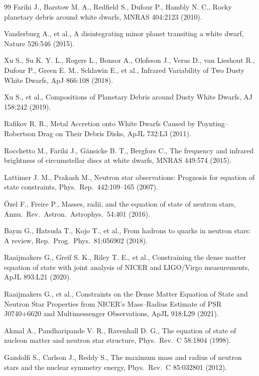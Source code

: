 \begin{thebibliography}{99}
Farihi J., Barstow M. A., Redfield S., Dufour P., Hambly N. C., Rocky planetary debris around white dwarfs, MNRAS 404:2123 (2010).

Vanderburg A., et al., A disintegrating minor planet transiting a white dwarf, Nature 526:546 (2015).

Xu S., Su K. Y. L., Rogers L., Bonsor A., Olofsson J., Veras D., van Lieshout R., Dufour P., Green E. M., Schlawin E., et al., Infrared Variability of Two Dusty White Dwarfs, ApJ 866:108 (2018).

Xu S., et al., Compositions of Planetary Debris around Dusty White Dwarfs, AJ 158:242 (2019).

Rafikov R. R., Metal Accretion onto White Dwarfs Caused by Poynting--Robertson Drag on Their Debris Disks, ApJL 732:L3 (2011).

Rocchetto M., Farihi J., G\"ansicke B. T., Bergfors C., The frequency and infrared brightness of circumstellar discs at white dwarfs, MNRAS 449:574 (2015).

Lattimer J. M., Prakash M., Neutron star observations: Prognosis for equation of state constraints, Phys.\ Rep.\ 442:109--165 (2007).

\"Ozel F., Freire P., Masses, radii, and the equation of state of neutron stars, Annu.\ Rev.\ Astron.\ Astrophys.\ 54:401 (2016).

Baym G., Hatsuda T., Kojo T., et al., From hadrons to quarks in neutron stars: A review, Rep.\ Prog.\ Phys.\ 81:056902 (2018).

Raaijmakers G., Greif S. K., Riley T. E., et al., Constraining the dense matter equation of state with joint analysis of NICER and LIGO/Virgo measurements, ApJL 893:L21 (2020).

Raaijmakers G., et al., Constraints on the Dense Matter Equation of State and Neutron Star Properties from NICER's Mass--Radius Estimate of PSR J0740+6620 and Multimessenger Observations, ApJL 918:L29 (2021).

Akmal A., Pandharipande V. R., Ravenhall D. G., The equation of state of nucleon matter and neutron star structure, Phys.\ Rev.\ C 58:1804 (1998).

Gandolfi S., Carlson J., Reddy S., The maximum mass and radius of neutron stars and the nuclear symmetry energy, Phys.\ Rev.\ C 85:032801 (2012).


\end{thebibliography}
